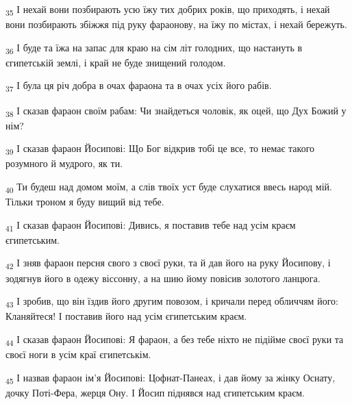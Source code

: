 \begin{tcolorbox}
\textsubscript{35} І нехай вони позбирають усю їжу тих добрих років, що приходять, і нехай вони позбирають збіжжя під руку фараонову, на їжу по містах, і нехай бережуть.
\end{tcolorbox}
\begin{tcolorbox}
\textsubscript{36} І буде та їжа на запас для краю на сім літ голодних, що настануть в єгипетській землі, і край не буде знищений голодом.
\end{tcolorbox}
\begin{tcolorbox}
\textsubscript{37} І була ця річ добра в очах фараона та в очах усіх його рабів.
\end{tcolorbox}
\begin{tcolorbox}
\textsubscript{38} І сказав фараон своїм рабам: Чи знайдеться чоловік, як оцей, що Дух Божий у нім?
\end{tcolorbox}
\begin{tcolorbox}
\textsubscript{39} І сказав фараон Йосипові: Що Бог відкрив тобі це все, то немає такого розумного й мудрого, як ти.
\end{tcolorbox}
\begin{tcolorbox}
\textsubscript{40} Ти будеш над домом моїм, а слів твоїх уст буде слухатися ввесь народ мій. Тільки троном я буду вищий від тебе.
\end{tcolorbox}
\begin{tcolorbox}
\textsubscript{41} І сказав фараон Йосипові: Дивись, я поставив тебе над усім краєм єгипетським.
\end{tcolorbox}
\begin{tcolorbox}
\textsubscript{42} І зняв фараон персня свого з своєї руки, та й дав його на руку Йосипову, і зодягнув його в одежу віссонну, а на шию йому повісив золотого ланцюга.
\end{tcolorbox}
\begin{tcolorbox}
\textsubscript{43} І зробив, що він їздив його другим повозом, і кричали перед обличчям його: Кланяйтеся! І поставив його над усім єгипетським краєм.
\end{tcolorbox}
\begin{tcolorbox}
\textsubscript{44} І сказав фараон Йосипові: Я фараон, а без тебе ніхто не підійме своєї руки та своєї ноги в усім краї єгипетськім.
\end{tcolorbox}
\begin{tcolorbox}
\textsubscript{45} І назвав фараон ім'я Йосипові: Цофнат-Панеах, і дав йому за жінку Оснату, дочку Поті-Фера, жерця Ону. І Йосип піднявся над єгипетським краєм.
\end{tcolorbox}
